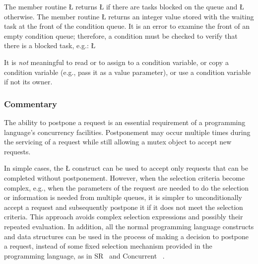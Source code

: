 \documentclass[openright,twoside]{report}
\begin{document}
The member routine \LGinlinetrue\LGbegin\lgrinde\L{}\endlgrinde\LGend{} returns \LGinlinetrue\LGbegin\lgrinde\L{}\endlgrinde\LGend{} if there are tasks blocked on the queue and \LGinlinetrue\LGbegin\lgrinde\L{}\endlgrinde\LGend{} otherwise.
The member routine \LGinlinetrue\LGbegin\lgrinde\L{}\endlgrinde\LGend{} returns an integer value stored with the waiting task at the front of the condition queue.
It is an error to examine the front of an empty condition queue;
therefore, a condition must be checked to verify that there is a blocked task, e.g.:
\LGinlinefalse\LGbegin\lgrinde
\L{}
\endlgrinde\LGend

It is \emph{not} meaningful to read or to assign to a condition variable, or copy a condition variable (e.g., pass it as a value parameter), or use a condition variable if not its owner.


\subsubsection{Commentary}
\label{s:PostponingRequests}

The ability to postpone a request is an essential requirement of a programming language's concurrency facilities.
Postponement may occur multiple times during the servicing of a request while still allowing a mutex object to accept new requests.

In simple cases, the \LGinlinetrue\LGbegin\lgrinde\L{}\endlgrinde\LGend{} construct can be used to accept only requests that can be completed without postponement.
However, when the selection criteria become complex, e.g., when the parameters of the request are needed to do the selection or information is needed from multiple queues, it is simpler to unconditionally accept a request and subsequently postpone it if it does not meet the selection criteria.
This approach avoids complex selection expressions and possibly their repeated evaluation.
In addition, all the normal programming language constructs and data structures can be used in the process of making a decision to postpone a request, instead of some fixed selection mechanism provided in the programming language, as in SR~\cite{SR} and Concurrent \CC~\cite{ConcurrentC++}.
\end{document}
